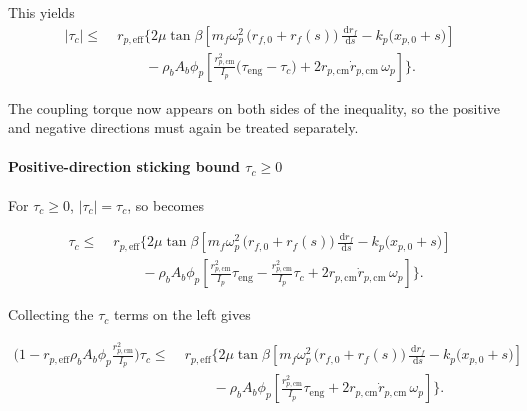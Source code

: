 \documentclass[11pt]{article}
\numberwithin{equation}{section}
\newcommand{\dd}{\,\mathrm{d}}
\begin{document}
This yields
\begin{equation}
\begin{aligned}
|\tau_c|
\le\;&
r_{p,\mathrm{eff}}
\Biggl\{
2\mu\tan\beta
\left[
m_f\omega_p^2\,\big(r_{f,0}+r_f(s)\big)\,\frac{\dd r_f}{\dd s}
-
k_p\bigl(x_{p,0}+s\bigr)
\right]
\\[4pt]
&\qquad
-
\rho_b A_b \phi_p
\left[
\frac{r_{p,\mathrm{cm}}^2}{I_p}\bigl(\tau_{\mathrm{eng}}-\tau_c\bigr)
+
2r_{p,\mathrm{cm}}\dot r_{p,\mathrm{cm}}\,\omega_p
\right]
\Biggr\}.
\end{aligned}
\label{eq:tau_p_capacity_stick_explicit}
\end{equation}

The coupling torque now appears on both sides of the inequality, so the
positive and negative directions must again be treated separately.

\paragraph{Positive-direction sticking bound \(\tau_c \ge 0\)}

For \(\tau_c \ge 0\), \(|\tau_c|=\tau_c\), so 
becomes

\begin{equation}
\begin{aligned}
\tau_c
\le\;&
r_{p,\mathrm{eff}}
\Biggl\{
2\mu\tan\beta
\left[
m_f\omega_p^2\,\big(r_{f,0}+r_f(s)\big)\,\frac{\dd r_f}{\dd s}
-
k_p\bigl(x_{p,0}+s\bigr)
\right]
\\[4pt]
&\qquad
-
\rho_b A_b \phi_p
\left[
\frac{r_{p,\mathrm{cm}}^2}{I_p}\tau_{\mathrm{eng}}
-
\frac{r_{p,\mathrm{cm}}^2}{I_p}\tau_c
+
2r_{p,\mathrm{cm}}\dot r_{p,\mathrm{cm}}\,\omega_p
\right]
\Biggr\}.
\end{aligned}
\label{eq:tau_p_plus_stick_expand}
\end{equation}

Collecting the \(\tau_c\) terms on the left gives

\begin{equation}
\begin{aligned}
\Biggl(
1
-
r_{p,\mathrm{eff}}\rho_b A_b \phi_p
\frac{r_{p,\mathrm{cm}}^2}{I_p}
\Biggr)\tau_c
\le\;&
r_{p,\mathrm{eff}}
\Biggl\{
2\mu\tan\beta
\left[
m_f\omega_p^2\,\big(r_{f,0}+r_f(s)\big)\,\frac{\dd r_f}{\dd s}
-
k_p\bigl(x_{p,0}+s\bigr)
\right]
\\[4pt]
&\qquad
-
\rho_b A_b \phi_p
\left[
\frac{r_{p,\mathrm{cm}}^2}{I_p}\tau_{\mathrm{eng}}
+
2r_{p,\mathrm{cm}}\dot r_{p,\mathrm{cm}}\,\omega_p
\right]
\Biggr\}.
\end{aligned}
\label{eq:tau_p_plus_stick_rearrange}
\end{equation}
\end{document}

